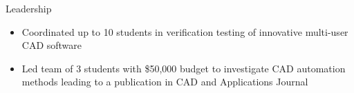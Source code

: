 \documentclass[]{friggeri-cv}
\begin{document}
\begin{entrylist}
{\begin{itemize}
    \end{itemize}\vspace{1mm}}




    \entry
    {}
    {Leadership}
    {}
    {\vspace{-4mm}
    \begin{itemize}
    \item Coordinated up to 10 students in verification testing of innovative multi-user CAD software
    \item Led team of 3 students with \$50,000 budget to investigate CAD automation methods leading to a publication in CAD and Applications Journal
    \end{itemize}\vspace{1mm}}








\end{entrylist}
\end{document}
